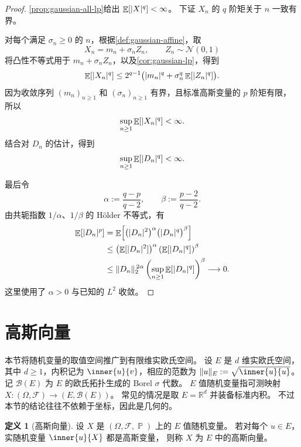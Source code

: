 \documentclass[UTF8,11pt,a4paper,oneside,fontset=fandol]{ctexrep}
\numberwithin{equation}{section}
\theoremstyle{plain}
\theoremstyle{definition}
\newtheorem{definition}[theorem]{定义}
\theoremstyle{remark}
\newcommand{\R}{\mathbb{R}}
\newcommand{\B}{\mathcal{B}}
\newcommand{\F}{\mathcal{F}}
\DeclareMathOperator{\Prob}{\mathbb{P}}
\DeclareMathOperator{\E}{\mathbb{E}}
\DeclarePairedDelimiter{\abs}{\lvert}{\rvert}
\DeclarePairedDelimiter{\norm}{\lVert}{\rVert}
\begin{document}
\begin{proof}
\cref{prop:gaussian-all-lp}给出
$\E[\abs{X}^q]<\infty$。
下证 $X_n$ 的 $q$ 阶矩关于 $n$ 一致有界。

对每个满足 $\sigma_n\ge0$ 的 $n$，根据\cref{def:gaussian-affine}，取
\[
  X_n=m_n+\sigma_n Z_n,
  \qquad Z_n\sim\mathcal{N}(0,1)
\]
将凸性不等式用于 $m_n+\sigma_nZ_n$，以及\cref{cor:gaussian-lp}，得到
\[
  \E[\abs{X_n}^q]
  \le2^{q-1}\bigl(\abs{m_n}^q+\sigma_n^q \E[\abs{Z_n}^q]\bigr).
\]
因为收敛序列 $(m_n)_{n\ge1}$ 和 $(\sigma_n)_{n\ge1}$ 有界，且标准高斯变量的 $p$ 阶矩有限，
所以
\[
  \sup_{n\ge1}\E[\abs{X_n}^q]<\infty.
\]
结合对 $D_n$ 的估计，得到
\[
  \sup_{n\ge1}\E[\abs{D_n}^q]<\infty.
\]

最后令
\[
  \alpha:=\frac{q-p}{q-2},\qquad
  \beta:=\frac{p-2}{q-2}.
\]
由共轭指数 $1/\alpha$、$1/\beta$ 的 Hölder 不等式，有
\begin{equation}
  \label{eq:gaussian-lp-interpolation}
  \begin{aligned}
    \E[\abs{D_n}^{p}]
    &=\E\!\left[
        \bigl(\abs{D_n}^2\bigr)^\alpha
        \bigl(\abs{D_n}^q\bigr)^\beta
      \right]\\
    &\le
      \left(\E[\abs{D_n}^2]\right)^\alpha
      \left(\E[\abs{D_n}^q]\right)^\beta\\
    &\le\norm{D_n}_2^{\,2\alpha}\left(\sup_{n\ge1}\E[\abs{D_n}^q]\right)^\beta
      \longrightarrow0.
  \end{aligned}
\end{equation}
这里使用了 $\alpha>0$ 与已知的 $L^2$ 收敛。
\end{proof}

\section{高斯向量}
\label{sec:gaussian-vectors}

本节将随机变量的取值空间推广到有限维实欧氏空间。
设 $E$ 是 $d$ 维实欧氏空间，其中 $d\ge1$，内积记为
$\inner{u}{v}$，相应的范数为 $\norm{u}_E:=\sqrt{\inner{u}{u}}$。
记 $\B(E)$ 为 $E$ 的欧氏拓扑生成的 Borel $\sigma$ 代数。
$E$ 值随机变量指可测映射 $X:(\Omega,\F)\to(E,\B(E))$。
常见的情况是取 $E=\R^d$ 并装备标准内积。
不过本节的结论往往不依赖于坐标，因此是几何的。

\begin{definition}[高斯向量]
\label{def:gaussian-vector}
设 $X$ 是 $(\Omega,\F,\Prob)$ 上的 $E$ 值随机变量。
若对每个 $u\in E$，实随机变量 $\inner{u}{X}$ 都是高斯变量，
则称 $X$ 为 $E$ 中的高斯向量。
\end{definition}
\end{document}
